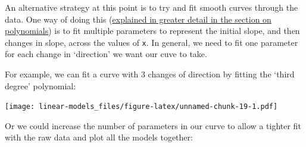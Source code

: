 \documentclass[]{article}
\newenvironment{Shaded}{\begin{snugshade}}{\end{snugshade}}
\newcommand{\DataTypeTok}[1]{\textcolor[rgb]{0.13,0.29,0.53}{#1}}
\newcommand{\DecValTok}[1]{\textcolor[rgb]{0.00,0.00,0.81}{#1}}
\newcommand{\KeywordTok}[1]{\textcolor[rgb]{0.13,0.29,0.53}{\textbf{#1}}}
\newcommand{\NormalTok}[1]{#1}
\newcommand{\OperatorTok}[1]{\textcolor[rgb]{0.81,0.36,0.00}{\textbf{#1}}}
\newcommand{\StringTok}[1]{\textcolor[rgb]{0.31,0.60,0.02}{#1}}
\begin{document}
An alternative strategy at this point is to try and fit smooth curves through
the data. One way of doing this
(\protect\hyperlink{polynomials}{explained in greater detail in the section on polynomials}) is
to fit multiple parameters to represent the initial slope, and then changes in
slope, across the values of \texttt{x}. In general, we need to fit one parameter for
each change in `direction' we want our cuve to take.

For example, we can fit a curve with 3 changes of direction by fitting the
`third degree' polynomial:

\begin{Shaded}
\end{Shaded}

\texttt{[image: linear-models\_files/figure-latex/unnamed-chunk-19-1.pdf]}

Or we could increase the number of parameters in our curve to allow a tighter
fit with the raw data and plot all the models together:
\end{document}
